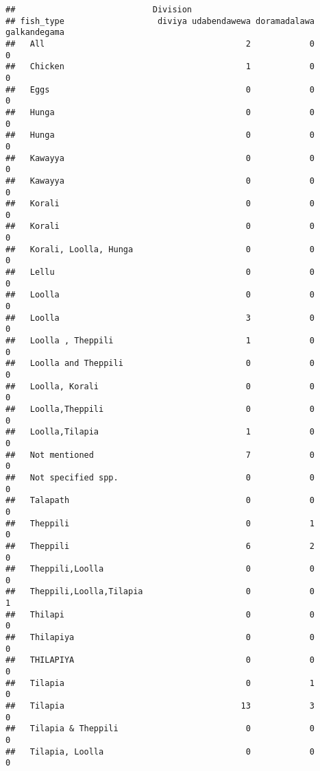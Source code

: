 \documentclass[
]{article}
\begin{document}
\begin{verbatim}
##                            Division
## fish_type                   diviya udabendawewa doramadalawa galkandegama
##   All                                         2            0            0
##   Chicken                                     1            0            0
##   Eggs                                        0            0            0
##   Hunga                                       0            0            0
##   Hunga                                       0            0            0
##   Kawayya                                     0            0            0
##   Kawayya                                     0            0            0
##   Korali                                      0            0            0
##   Korali                                      0            0            0
##   Korali, Loolla, Hunga                       0            0            0
##   Lellu                                       0            0            0
##   Loolla                                      0            0            0
##   Loolla                                      3            0            0
##   Loolla , Theppili                           1            0            0
##   Loolla and Theppili                         0            0            0
##   Loolla, Korali                              0            0            0
##   Loolla,Theppili                             0            0            0
##   Loolla,Tilapia                              1            0            0
##   Not mentioned                               7            0            0
##   Not specified spp.                          0            0            0
##   Talapath                                    0            0            0
##   Theppili                                    0            1            0
##   Theppili                                    6            2            0
##   Theppili,Loolla                             0            0            0
##   Theppili,Loolla,Tilapia                     0            0            1
##   Thilapi                                     0            0            0
##   Thilapiya                                   0            0            0
##   THILAPIYA                                   0            0            0
##   Tilapia                                     0            1            0
##   Tilapia                                    13            3            0
##   Tilapia & Theppili                          0            0            0
##   Tilapia, Loolla                             0            0            0

\end{verbatim}
\end{document}

